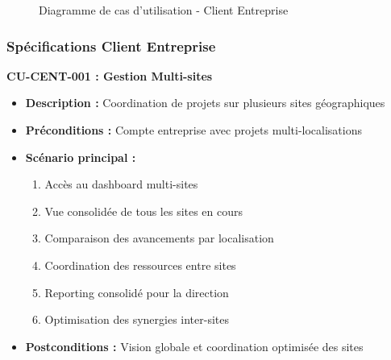 \begin{figure}[H]
\caption{Diagramme de cas d'utilisation - Client Entreprise}
\label{fig:cas_utilisation_client_entreprise}
\end{figure}

\subsubsection{Spécifications Client Entreprise}

\textbf{CU-CENT-001 : Gestion Multi-sites}
\begin{itemize}
    \item \textbf{Description :} Coordination de projets sur plusieurs sites géographiques
    \item \textbf{Préconditions :} Compte entreprise avec projets multi-localisations
    \item \textbf{Scénario principal :}
    \begin{enumerate}
        \item Accès au dashboard multi-sites
        \item Vue consolidée de tous les sites en cours
        \item Comparaison des avancements par localisation
        \item Coordination des ressources entre sites
        \item Reporting consolidé pour la direction
        \item Optimisation des synergies inter-sites
    \end{enumerate}
    \item \textbf{Postconditions :} Vision globale et coordination optimisée des sites
\end{itemize}

